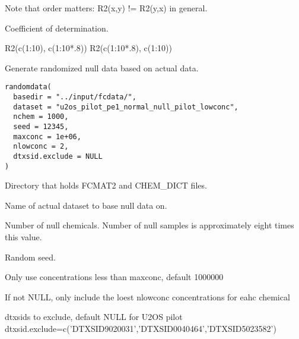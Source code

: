 \documentclass[letterpaper]{book}
\begin{document}
%
\begin{Details}\relax
Note that order matters: R2(x,y) != R2(y,x) in general.
\end{Details}
%
\begin{Value}
Coefficient of determination.
\end{Value}
%
\begin{Examples}
\begin{ExampleCode}
R2(c(1:10), c(1:10*.8))
R2(c(1:10*.8), c(1:10))
\end{ExampleCode}
\end{Examples}
%
\begin{Description}\relax
Generate randomized null data based on actual data.
\end{Description}
%
\begin{Usage}
\begin{verbatim}
randomdata(
  basedir = "../input/fcdata/",
  dataset = "u2os_pilot_pe1_normal_null_pilot_lowconc",
  nchem = 1000,
  seed = 12345,
  maxconc = 1e+06,
  nlowconc = 2,
  dtxsid.exclude = NULL
)
\end{verbatim}
\end{Usage}
%
\begin{Arguments}
\begin{ldescription}
\item[\code{basedir}] Directory that holds FCMAT2 and CHEM\_DICT files.

\item[\code{dataset}] Name of actual dataset to base null data on.

\item[\code{nchem}] Number of null chemicals. Number of null samples is approximately
eight times this value.

\item[\code{seed}] Random seed.

\item[\code{maxconc}] Only use concentrations less than maxconc, default 1000000

\item[\code{nlowconc}] If not NULL, only include the loest nlowconc concentrations for eahc chemical

\item[\code{dtxsid.exclude}] dtxsids to exclude, default NULL
for U2OS pilot dtxsid.exclude=c('DTXSID9020031','DTXSID0040464','DTXSID5023582')
\end{ldescription}
\end{Arguments}
\end{document}
